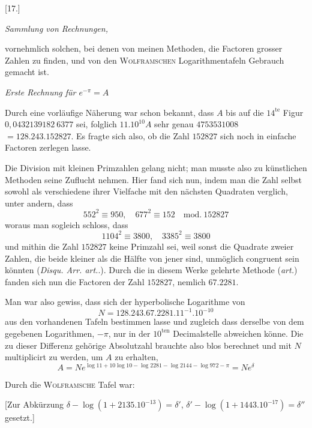 
\par\medskip{}\centerline{[17.]}

\begin{center}\textit{Sammlung von Rechnungen,}\end{center}
vornehmlich solchen, bei denen von meinen Methoden, die Factoren grosser
Zahlen zu finden, und von den \textsc{Wolframschen} Logarithmentafeln Gebrauch gemacht
ist.

\begin{center}\textit{Erste Rechnung für $e^{-\pi}=A$}\end{center}

Durch eine vorläufige Näherung war schon bekannt, dass $A$ bis auf die
$14^{\mathrm{te}}$ Figur $0,0432139182\ 6377$ sei, folglich $11.10^{10}A$ sehr genau $4753531008$
$=128.243.152827$. Es fragte sich also, ob die Zahl $152827$ sich noch in einfache
Factoren zerlegen lasse.

Die Division mit kleinen Primzahlen gelang nicht; man musste also zu
künstlichen Methoden seine Zuflucht nehmen. Hier fand sich nun, indem man
die Zahl selbst sowohl als verschiedene ihrer Vielfache mit den nächsten Quadraten
verglich, unter andern, dass
\[
552^2\equiv950,\quad677^2\equiv152\quad\mathrm{mod.}\ 152827
\]
woraus man sogleich schloss, dass
\[
1104^2\equiv3800,\quad3385^2\equiv3800
\]
und mithin die Zahl $152827$ keine Primzahl sei, weil sonst die Quadrate zweier
Zahlen, die beide kleiner als die Hälfte von jener sind, unmöglich congruent
sein könnten (\textit{Disqu. Arr. art.}\quad.). Durch die in diesem Werke gelehrte Methode
(\textit{art.}\quad) fanden sich nun die Factoren der Zahl $152827$, nemlich $67.2281$.

Man war also gewiss, dass sich der hyperbolische Logarithme von
\[
N=128.243.67.2281.11^{-1}.10^{-10}
\]
aus den vorhandenen Tafeln bestimmen lasse und zugleich dass derselbe von dem
gegebenen Logarithmen, $-\pi$, nur in der $10^{\mathrm{ten}}$ Decimalstelle abweichen könne.
Die zu dieser Differenz gehörige Absolutzahl brauchte also blos berechnet und
mit $N$ multiplicirt zu werden, um $A$ zu erhalten,
\[
A=Ne^{\log11+10\log10-\log2281-\log2144-\log972-\pi}=Ne^\delta
\]


Durch die \textsc{Wolframsche} Tafel war:

[Zur Abkürzung $\delta-\log(1+2135.10^{-13})=\delta'$,
$\delta'-\log(1+1443.10^{-17})=\delta''$ gesetzt.]

